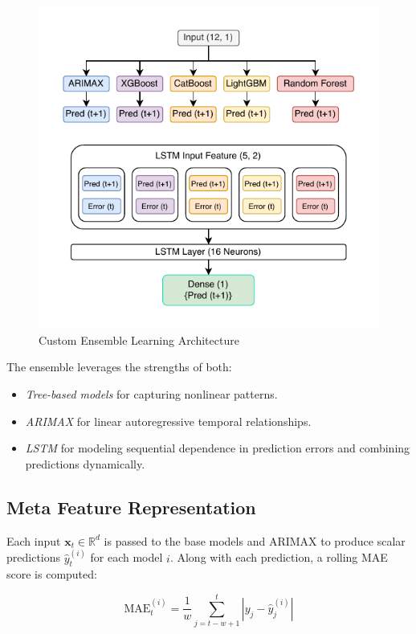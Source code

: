 \begin{figure}[h!]
    \centering
    \includegraphics[width=\textwidth]{Images/Ensemble_.pdf}
    \caption{Custom Ensemble Learning Architecture}
    \label{fig:custom_ensemble_architecture}
\end{figure}

The ensemble leverages the strengths of both:
\begin{itemize}
    \item \textit{Tree-based models} for capturing nonlinear patterns.
    \item \textit{ARIMAX} for linear autoregressive temporal relationships.
    \item \textit{LSTM} for modeling sequential dependence in prediction errors and combining predictions dynamically.
\end{itemize}

\subsection{Meta Feature Representation}

Each input $\mathbf{x}_t \in \mathbb{R}^{d}$ is passed to the base models and ARIMAX to produce scalar predictions $\hat{y}_{t}^{(i)}$ for each model $i$. Along with each prediction, a rolling MAE score is computed:

\begin{equation}
\text{MAE}_{t}^{(i)} = \frac{1}{w} \sum_{j=t-w+1}^{t} \left| y_j - \hat{y}_j^{(i)} \right|
\end{equation}

